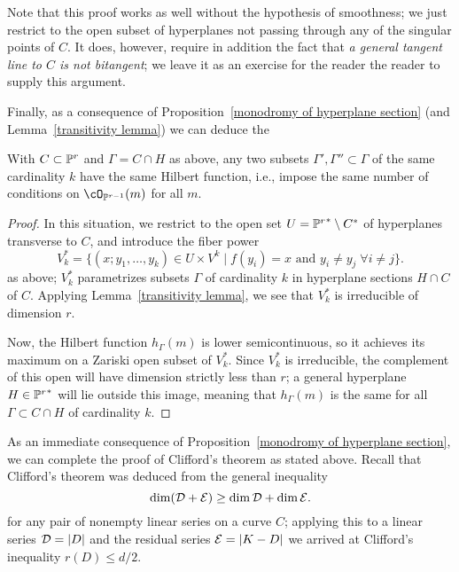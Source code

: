Note that this proof works as well without the hypothesis of smoothness; we just restrict to the open subset of hyperplanes not passing through any of the singular points of $C$. It does, however, require in addition the fact that \emph{a general tangent line to $C$ is not bitangent}; we leave it as an exercise for the reader the reader to supply this argument.

Finally, as a consequence of Proposition~\ref{monodromy of hyperplane section} (and Lemma~\ref{transitivity lemma}) we can deduce the

\begin{lemma}
With $C \subset \PP^r$ and $\Gamma = C \cap H$ as above, any two subsets $\Gamma', \Gamma'' \subset \Gamma$ of the same cardinality $k$ have the same Hilbert function, i.e., impose the same number of conditions on $\cO_{\PP^{r-1}}(m)$ for all $m$.
\end{lemma}

\begin{proof}
In this situation, we restrict to the open set $U = {\PP^r}^* \setminus C^*$ of hyperplanes transverse to $C$, and introduce the fiber power
$$
V_k^* = \{ (x; y_1,\dots, y_k) \in U \times V^k \mid f(y_i) = x \text{ and } y_i \neq y_j \; \forall i \neq j\}.
$$
as above; $V_k^*$ parametrizes subsets $\Gamma$ of cardinality $k$ in hyperplane sections $H \cap C$ of $C$. Applying Lemma~\ref{transitivity lemma}, we see that $V_k^*$ is irreducible of dimension $r$. 

Now, the Hilbert function $h_\Gamma(m)$ is lower semicontinuous, so it achieves its maximum on a Zariski open subset of $V_k^*$. Since $V_k^*$ is irreducible, the complement of this open will have dimension strictly less than $r$;  a general hyperplane $H \in {\PP^r}^*$ will lie outside this image, meaning that $h_\Gamma(m)$ is the same for all $\Gamma \subset C \cap H$ of cardinality $k$.
\end{proof}

As an immediate consequence of Proposition~\ref{monodromy of hyperplane section}, we can complete the proof of Clifford's theorem as stated above. Recall that Clifford's theorem was deduced from the general inequality 
$$
\dim(\cD + \cE) \geq \dim \cD + \dim \cE.
$$
for any pair of nonempty linear series on a curve $C$; applying this to a linear series $\cD = |D|$ and the residual series $\cE = |K-D|$ we arrived at Clifford's inequality $r(D) \leq d/2$.

